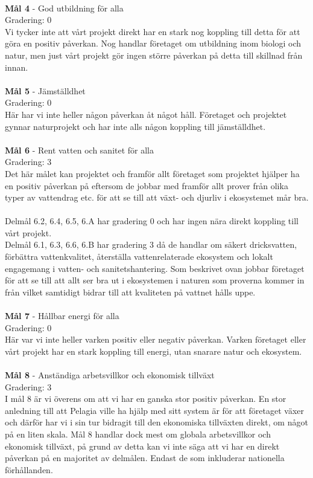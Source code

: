 \\
\textbf{Mål 4}
 - God utbildning för alla
\\
Gradering: 0
\\
Vi tycker inte att vårt projekt direkt har en stark nog koppling till detta för att göra en positiv påverkan. Nog handlar företaget om utbildning inom biologi och natur, men just vårt projekt gör ingen större påverkan på detta till skillnad från innan. 
\\
\\
\textbf{Mål 5}
 - Jämställdhet
\\
Gradering: 0
\\
Här har vi inte heller någon påverkan åt något håll. Företaget och projektet gynnar naturprojekt och har inte alls någon koppling till jämställdhet.
\\
\\
\textbf{Mål 6}
 - Rent vatten och sanitet för alla
\\
Gradering: 3
\\
Det här målet kan projektet och framför allt företaget som projektet hjälper ha en positiv påverkan på eftersom de jobbar med framför allt prover från olika typer av vattendrag etc. för att se till att växt- och djurliv i ekosystemet mår bra.
\\
\\
Delmål 6.2, 6.4, 6.5, 6.A har gradering 0 och har ingen nära direkt koppling till vårt projekt.
\\
Delmål 6.1, 6.3, 6.6, 6.B har gradering 3 då de handlar om säkert dricksvatten, förbättra vattenkvalitet, återställa vattenrelaterade ekosystem och lokalt engagemang i vatten- och sanitetshantering. Som beskrivet ovan jobbar företaget för att se till att allt ser bra ut i ekosystemen i naturen som proverna kommer in från vilket samtidigt bidrar till att kvaliteten på vattnet hålls uppe. 
\\
\\
\textbf{Mål 7}
 - Hållbar energi för alla
\\
Gradering: 0
\\
Här var vi inte heller varken positiv eller negativ påverkan. Varken företaget eller vårt projekt har en stark koppling till energi, utan snarare natur och ekosystem. 
\\
\\
\textbf{Mål 8}
 - Anständiga arbetsvillkor och ekonomisk tillväxt
\\
Gradering: 3
\\
I mål 8 är vi överens om att vi har en ganska stor positiv påverkan. En stor anledning till att Pelagia ville ha hjälp med sitt system är för att företaget växer och därför har vi i sin tur bidragit till den ekonomiska tillväxten direkt, om något på en liten skala. Mål 8 handlar dock mest om globala arbetsvillkor och ekonomisk tillväxt, på grund av detta kan vi inte säga att vi har en direkt påverkan på en majoritet av delmålen. Endast de som inkluderar nationella förhållanden.
